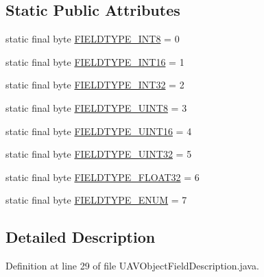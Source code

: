 \subsection*{\-Static \-Public \-Attributes}
\begin{DoxyCompactItemize}
\item 
static final byte \hyperlink{classorg_1_1taulabs_1_1uavtalk_1_1_u_a_v_object_field_description_a17612ae29b2cbdd074a6f64afe7d691a}{\-F\-I\-E\-L\-D\-T\-Y\-P\-E\-\_\-\-I\-N\-T8} = 0
\item 
static final byte \hyperlink{classorg_1_1taulabs_1_1uavtalk_1_1_u_a_v_object_field_description_a5993b8ebf7b63241ec528471d1a05d3b}{\-F\-I\-E\-L\-D\-T\-Y\-P\-E\-\_\-\-I\-N\-T16} = 1
\item 
static final byte \hyperlink{classorg_1_1taulabs_1_1uavtalk_1_1_u_a_v_object_field_description_a20c83740bd7e11baa49b4e4478c343b9}{\-F\-I\-E\-L\-D\-T\-Y\-P\-E\-\_\-\-I\-N\-T32} = 2
\item 
static final byte \hyperlink{classorg_1_1taulabs_1_1uavtalk_1_1_u_a_v_object_field_description_a35a1cfdb03119d8107d7d16e92821b1b}{\-F\-I\-E\-L\-D\-T\-Y\-P\-E\-\_\-\-U\-I\-N\-T8} = 3
\item 
static final byte \hyperlink{classorg_1_1taulabs_1_1uavtalk_1_1_u_a_v_object_field_description_ab61cb83768196bce3426887af7e1efff}{\-F\-I\-E\-L\-D\-T\-Y\-P\-E\-\_\-\-U\-I\-N\-T16} = 4
\item 
static final byte \hyperlink{classorg_1_1taulabs_1_1uavtalk_1_1_u_a_v_object_field_description_a860d6a63cf30e7aad7c6907e2b45a38c}{\-F\-I\-E\-L\-D\-T\-Y\-P\-E\-\_\-\-U\-I\-N\-T32} = 5
\item 
static final byte \hyperlink{classorg_1_1taulabs_1_1uavtalk_1_1_u_a_v_object_field_description_a59c29169f377d43a9218dda143e9cd2c}{\-F\-I\-E\-L\-D\-T\-Y\-P\-E\-\_\-\-F\-L\-O\-A\-T32} = 6
\item 
static final byte \hyperlink{classorg_1_1taulabs_1_1uavtalk_1_1_u_a_v_object_field_description_a46022d1b3b3ec69ffe09361dae7703a5}{\-F\-I\-E\-L\-D\-T\-Y\-P\-E\-\_\-\-E\-N\-U\-M} = 7
\end{DoxyCompactItemize}


\subsection{\-Detailed \-Description}


\-Definition at line 29 of file \-U\-A\-V\-Object\-Field\-Description.\-java.




